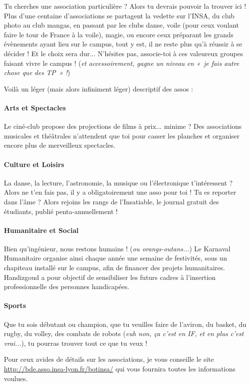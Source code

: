 Tu cherches une association particulière ? Alors tu devrais pouvoir la trouver ici !
Plus d'une centaine d'associations se partagent la vedette sur l'INSA, du club photo au club mangas, en
passant par les clubs danse, voile (pour ceux
voulant faire le tour de France à la voile), magie, ou encore ceux
préparant les grands évènements ayant lieu sur le campus, tout y est, il ne
reste plus qu'à réussir à se décider ! Et le choix sera dur...
N'hésites pas, associe-toi à ces valeureux groupes faisant vivre le campus ! (\emph{et accessoirement, gagne un niveau en «~je fais autre chose que
des TP~» !})

Voilà un léger (mais alors infiniment léger) descriptif des assos :

\paragraph{Arts et Spectacles}
Le ciné-club propose des projections de films à prix... minime ?
Des associations musicales et théâtrales n'attendent que toi pour casser les planches et organiser encore plus de merveilleux spectacles.

\paragraph{Culture et Loisirs}
La danse, la lecture, l'astronomie, la musique ou l'électronique t'intéressent ?
Alors ne t'en fais pas, il y a obligatoirement une asso pour toi !
Tu es reporter dans l'âme ? Alors rejoins les rangs de l'Insatiable, le journal gratuit des étudiants, publié penta-annuellement !

\paragraph{Humanitaire et Social}
Bien qu'ingénieur, nous restons humains ! (\emph{ou orangs-outans...})
Le Karnaval Humanitaire organise ainsi chaque année une semaine de festivités,
sous un chapiteau installé sur le campus, afin de financer des projets
humanitaires.
Handizgoud a pour objectif de sensibiliser les futurs cadres à l'insertion
professionnelle des personnes handicapées.

\paragraph{Sports}
Que tu sois débutant ou champion, que tu veuilles faire de l'aviron, du
basket, du rugby, du volley, des combats de robots (\emph{euh non, ça
c'est en IF, et en plus c'est vrai...}), tu pourras trouver tout ce que tu veux !

Pour ceux avides de détails sur les associations, je vous conseille le site 
\url{http://bde.asso.insa-lyon.fr/botinsa/} qui vous fournira toutes les
informations voulues.

